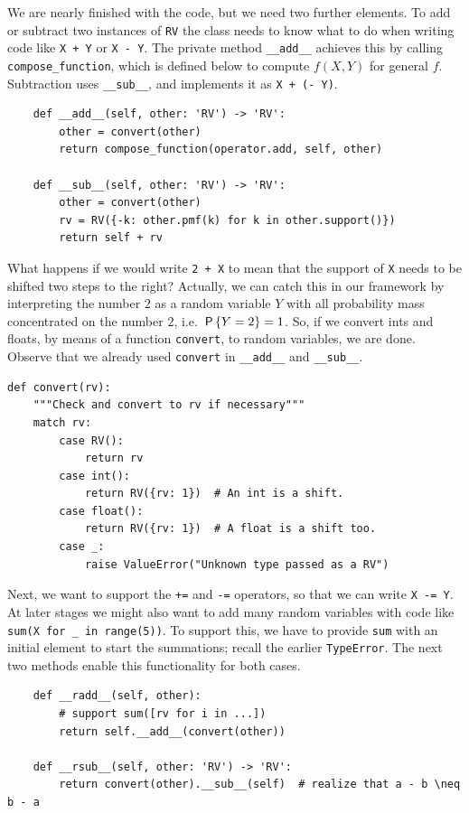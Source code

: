 \documentclass[queueing-book]{subfiles}
\begin{document}
We are nearly finished with the code, but we need two further elements.
To add or subtract two instances of \texttt{RV} the class needs to know what to do when writing code like \texttt{X + Y} or \texttt{X - Y}.
The private method \texttt{\_\_add\_\_} achieves this by calling \texttt{compose\_function}, which is defined below to compute \(f(X, Y)\) for general \(f\).
Subtraction uses  \texttt{\_\_sub\_\_}, and implements it as \texttt{X + (- Y)}.
\begin{verbatim}
    def __add__(self, other: 'RV') -> 'RV':
        other = convert(other)
        return compose_function(operator.add, self, other)

    def __sub__(self, other: 'RV') -> 'RV':
        other = convert(other)
        rv = RV({-k: other.pmf(k) for k in other.support()})
        return self + rv
\end{verbatim}

What happens if we would write \texttt{2 + X} to mean that the support of \texttt{X} needs to be shifted two steps to the right?
Actually, we can catch this in our framework by interpreting the number \(2\) as a random variable \(Y\) with all probability mass concentrated on the number \(2\), i.e.
\(\P{Y=2} = 1\). So, if we convert ints and floats, by means of a function \texttt{convert}, to random variables,  we are done. Observe that we already used \texttt{convert} in \texttt{\_\_add\_\_} and \texttt{\_\_sub\_\_}.
\begin{verbatim}
def convert(rv):
    """Check and convert to rv if necessary"""
    match rv:
        case RV():
            return rv
        case int():
            return RV({rv: 1})  # An int is a shift.
        case float():
            return RV({rv: 1})  # A float is a shift too.
        case _:
            raise ValueError("Unknown type passed as a RV")
\end{verbatim}


Next, we want to support the \texttt{+=} and \texttt{-=} operators, so that we can write \texttt{X -= Y}.
At later stages we might also want to add many random variables with code like \texttt{sum(X for \_ in range(5))}.
To support this, we have to provide \texttt{sum} with an initial element to start the summations; recall the earlier \texttt{TypeError}.
The next two methods enable this functionality for both cases.

\begin{verbatim}
    def __radd__(self, other):
        # support sum([rv for i in ...])
        return self.__add__(convert(other))

    def __rsub__(self, other: 'RV') -> 'RV':
        return convert(other).__sub__(self)  # realize that a - b \neq b - a
\end{verbatim}
\end{document}
